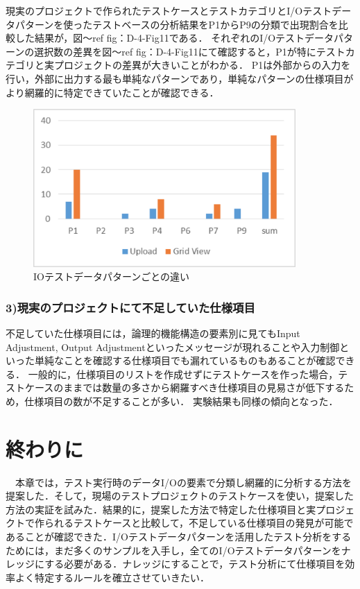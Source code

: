 \documentclass[a4paper,12pt]{jreport}
\begin{document}
現実のプロジェクトで作られたテストケースとテストカテゴリとI/Oテストデータパターンを使ったテストベースの分析結果をP1からP9の分類で出現割合を比較した結果が，図〜ref {fig：D-4-Fig11}である．
それぞれのI/Oテストデータパターンの選択数の差異を図〜ref {fig：D-4-Fig11}にて確認すると，P1が特にテストカテゴリと実プロジェクトの差異が大きいことがわかる．
P1は外部からの入力を行い，外部に出力する最も単純なパターンであり，単純なパターンの仕様項目がより網羅的に特定できていたことが確認できる．
   \begin{figure}[htbp]
  \begin{center}
  \includegraphics[width=10cm]{./image/D-4-Fig11.png}
  \caption{IOテストデータパターンごとの違い}
  \label{fig:D-4-Fig11}
  \end{center}
   \end{figure}


\subsubsection{3)現実のプロジェクトにて不足していた仕様項目}
%

不足していた仕様項目には，論理的機能構造の要素別に見てもInput Adjustment, Output Adjustmentといったメッセージが現れることや入力制御といった単純なことを確認する仕様項目でも漏れているものもあることが確認できる．
一般的に，仕様項目のリストを作成せずにテストケースを作った場合，テストケースのままでは数量の多さから網羅すべき仕様項目の見易さが低下するため，仕様項目の数が不足することが多い．
実験結果も同様の傾向となった．

\section{終わりに}
　本章では，テスト実行時のデータI/Oの要素で分類し網羅的に分析する方法を提案した．そして，現場のテストプロジェクトのテストケースを使い，提案した方法の実証を試みた．結果的に，提案した方法で特定した仕様項目と実プロジェクトで作られるテストケースと比較して，不足している仕様項目の発見が可能であることが確認できた．I/Oテストデータパターンを活用したテスト分析をするためには，まだ多くのサンプルを入手し，全てのI/Oテストデータパターンをナレッジにする必要がある．ナレッジにすることで，テスト分析にて仕様項目を効率よく特定するルールを確立させていきたい．
\end{document}
